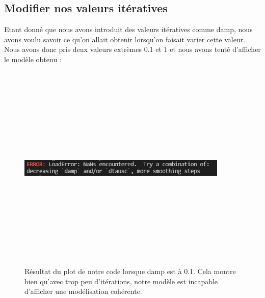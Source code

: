 \documentclass{article}
\begin{document}
\subsection{Modifier nos valeurs itératives}

Etant donné que nous avons introduit des valeurs itératives comme damp, nous avons voulu savoir ce qu'on allait obtenir lorsqu'on faisait varier cette valeur. Nous avons donc pris deux valeurs extrèmes 0.1 et 1 et nous avons tenté d'afficher le modèle obtenu :
\begin{figure}[!htpb]
\centering
\includegraphics[width=10cm, keepaspectratio=true, height=10cm]{Damp01.png}
\caption{Résultat du plot de notre code lorsque damp est à 0.1. Cela montre bien qu'avec trop peu d'itérations, notre modèle est incapable d'afficher une modélisation cohérente.}
\end{figure}
\end{document}
